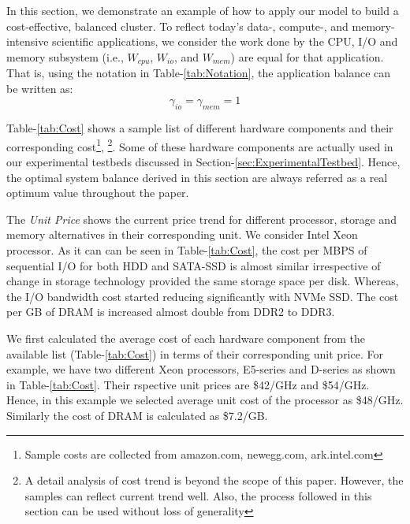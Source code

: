 \documentclass[journal]{IEEEtran}
\begin{document}
In this section, we demonstrate an example of how to apply our model to build a cost-effective, balanced cluster. To reflect today's data-, compute-, and memory-intensive scientific applications, we consider the work done by the CPU, I/O and memory subsystem (i.e., $W_{cpu}$, $W_{io}$, and $W_{mem}$) are equal for that application. That is, using the notation in Table-\ref{tab:Notation}, the application balance  can be written as:
\begin{equation} \label{eqn:PractAppBal}
\gamma_{io} = \gamma_{mem} = 1
\end{equation}

Table-\ref{tab:Cost} shows a sample list of different hardware components and their corresponding cost\footnote {Sample costs are collected from amazon.com, newegg.com, ark.intel.com}, \footnote{A detail analysis of cost trend is beyond the scope of this paper. However, the samples can reflect current trend well. Also, the process followed in this section can be used without loss of generality}. Some of these hardware components are actually used in our experimental testbeds discussed in Section-\ref{sec:ExperimentalTestbed}. Hence, the optimal system balance derived in this section are always referred as a real optimum value throughout the paper. 

The \textit{Unit Price} shows the current price trend  for different processor, storage and memory alternatives in their corresponding unit. We consider Intel Xeon processor. As it can can be seen in  Table-\ref{tab:Cost}, the cost per MBPS of sequential I/O for both HDD and SATA-SSD is almost similar irrespective of change in storage technology provided the same storage space per disk. Whereas, the I/O bandwidth cost started reducing significantly with NVMe SSD. The cost per GB of DRAM is increased almost double from DDR2 to DDR3. 

We first calculated the average cost of each hardware component from the available list (Table-\ref{tab:Cost}) in terms of their corresponding unit price. For example, we have two different Xeon processors, E5-series and D-series as shown in Table-\ref{tab:Cost}. Their rspective unit prices are \$42/GHz and \$54/GHz. Hence, in this example we selected average unit cost of the processor as \$48/GHz. Similarly the cost of DRAM is calculated as \$7.2/GB. 
\end{document}

